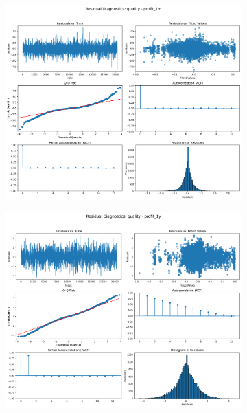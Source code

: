 \documentclass[11pt,english,a4paper,hidelinks]{book}
\begin{document}
\begin{figure}[H]
    \centering
    \begin{subfigure}[b]{0.32\textwidth}
        \centering
        \includegraphics[width=\textwidth]{images/code/models/linear_regression/first_model/AF/quality_profit_1m_residuals - Gaussian.png}
    \end{subfigure}
    \hfill
    \begin{subfigure}[b]{0.32\textwidth}
        \centering
        \includegraphics[width=\textwidth]{images/code/models/linear_regression/first_model/AF/quality_profit_1y_residuals - Gaussian.png}

\end{subfigure}
\end{figure}
\end{document}
